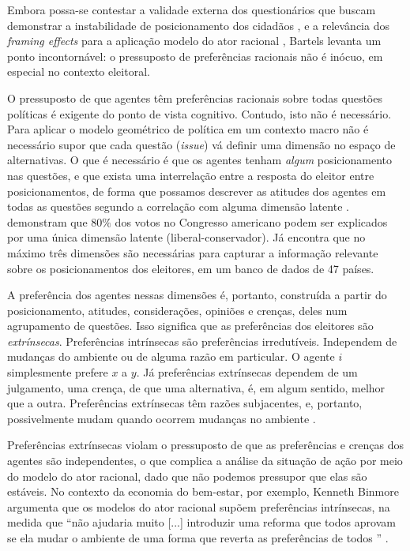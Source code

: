 Embora possa-se contestar a validade externa dos questionários que buscam
demonstrar a instabilidade de posicionamento dos cidadãos
\cite{druckman2012public}, e a relevância dos \textit{framing effects} para a
aplicação modelo do ator racional \cite[p. 107]{gintis2016individuality},
Bartels levanta um ponto incontornável: o pressuposto de preferências racionais
não é inócuo, em especial no contexto eleitoral.

O pressuposto de que agentes têm preferências racionais sobre todas questões
políticas é exigente do ponto de vista cognitivo. Contudo, isto não é
necessário. Para aplicar o modelo geométrico de política em um contexto macro
não é necessário supor que cada questão (\textit{issue}) vá definir uma dimensão
no espaço de alternativas. O que é necessário é que os agentes tenham
\textit{algum} posicionamento nas questões, e que exista uma interrelação entre
a resposta do eleitor entre posicionamentos, de forma que possamos descrever as
atitudes dos agentes em todas as questões segundo a correlação com alguma
dimensão latente \cite{poole2005spatial,laver2014measuring}.
 demonstram que $80\%$ dos votos no Congresso
americano podem ser explicados por uma única dimensão latente
(liberal-conservador). Já  encontra que no máximo
três dimensões são necessárias para capturar a informação relevante sobre os
posicionamentos dos eleitores, em um banco de dados de 47 países.

A preferência dos agentes nessas dimensões é, portanto, construída a partir do
posicionamento, atitudes, considerações, opiniões e crenças, deles num
agrupamento de questões. Isso significa que as preferências dos eleitores são
\textit{extrínsecas}. Preferências intrínsecas são preferências irredutíveis.
Independem de mudanças do ambiente ou de alguma razão em particular. O agente
\(i\) simplesmente prefere \(x\) a \(y\). Já preferências extrínsecas dependem
de um julgamento, uma crença, de que uma alternativa, é, em algum sentido, melhor
que a outra. Preferências extrínsecas têm razões subjacentes, e, portanto,
possivelmente mudam quando ocorrem mudanças no ambiente \cite{liu2010wright,
  binmore2008rational}.

Preferências extrínsecas violam o pressuposto de que as preferências e crenças
dos agentes são independentes, o que complica a análise da situação de ação por
meio do modelo do ator racional, dado que não podemos pressupor que elas são
estáveis. No contexto da economia do bem-estar, por exemplo,
Kenneth Binmore argumenta que os modelos do ator racional supõem
preferências intrínsecas, na medida que ``não ajudaria muito [...] introduzir uma
reforma que todos aprovam se ela mudar o ambiente de uma forma que reverta as
preferências de todos '' \cite[p.6]{binmore2008rational}.

